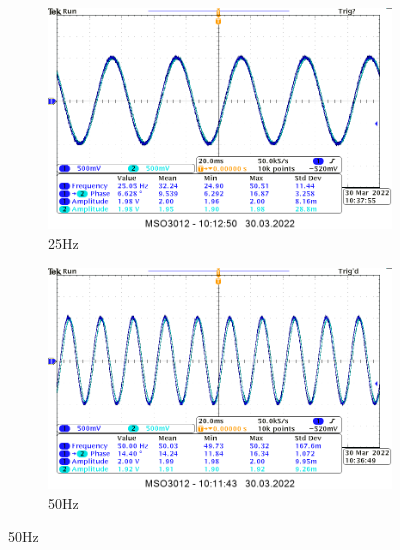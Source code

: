 { 
\begin{figure}[H]
    \centering
    \begin{subfigure}[h]{0.4\textwidth}
        \includegraphics[width=\textwidth]{img_osciloscope/RC/RC_25Hz_cropped.png}
        \caption*{25Hz}
    \end{subfigure}
    \begin{subfigure}[h]{0.4\textwidth}
        \includegraphics[width=\textwidth]{img_osciloscope/RC/RC_50Hz_cropped.png}
        \caption*{50Hz}
    \end{subfigure}
\end{figure}

}
